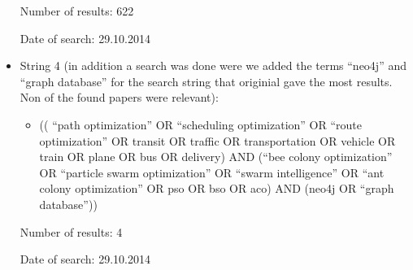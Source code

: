 \begin{itemize}
\begin{itemize}
\end{itemize}
\par Number of results: 622
\par Date of search: 29.10.2014
\item String 4 (in addition a search was done were we added the terms ``neo4j'' and ``graph database'' for the search string that originial gave the most results. Non of the found papers were relevant): 
\begin{itemize}
\item (( ``path optimization'' OR ``scheduling optimization'' OR ``route optimization'' OR transit OR traffic OR transportation OR vehicle OR train OR plane OR bus OR delivery) AND (``bee colony optimization'' OR ``particle swarm optimization'' OR ``swarm intelligence'' OR ``ant colony optimization'' OR pso OR bso OR aco) AND (neo4j OR ``graph database''))
\end{itemize}
\par Number of results: 4
\par Date of search: 29.10.2014
\end{itemize}

